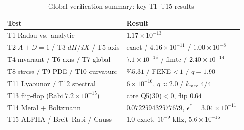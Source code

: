 \documentclass[12pt,a4paper]{article}
\begin{document}
\begin{table}[htbp]
\centering
\footnotesize
\setlength{\tabcolsep}{2pt}
\caption{Global verification summary: key T1--T15 results.}
\vspace{0.1cm}
\begin{tabular}{@{}l|l@{}}
\hline
Test & Result \\
\hline
T1 Radau vs.\ analytic & $1.17\times 10^{-13}$ \\
T2 $A+D=1$ / T3 $d\Pi/dX$ / T5 axis & exact / $4.16\times 10^{-11}$ / $1.00\times 10^{-8}$ \\
T4 invariant / T6 axis / T7 global & $7.1\times 10^{-15}$ / finite / $2.40\times 10^{-14}$ \\
T8 stress / T9 PDE / T10 curvature & $\%5.31$ / FENE$<1$ / $q=1.90$ \\
T11 Lyapunov / T12 spectral & $6\times 10^{-16}$, $q\approx2.0$ / $k_{\max}$ 4/4 \\
T13 flip-flop (Rabi $7.2\times 10^{-15}$) & core Q5(30)$<0$, flip $0.64$ \\
T14 Meral + Boltzmann & $0.072269432677679$, $\epsilon^*=3.04\times 10^{-11}$ \\
T15 ALPHA / Breit--Rabi / Gauss & $1.0$ exact, $10^{-9}$ kHz, $5.6\times 10^{-16}$ \\
\hline
\end{tabular}
\end{table}
\end{document}
